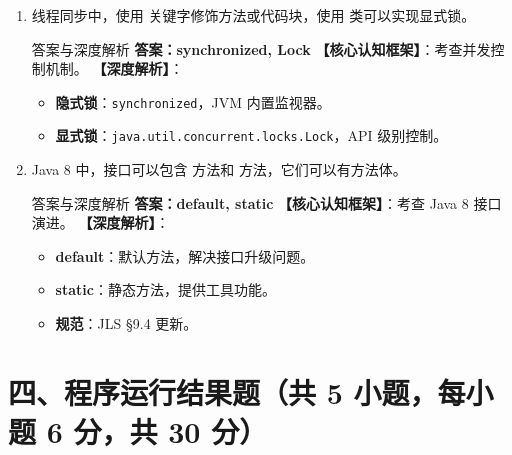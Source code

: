 ﻿\documentclass[12pt, a4paper]{ctexart}
\newcommand{\blank}{\underline{\hspace{2cm}}}
\newcommand{\code}[1]{\texttt{#1}}
\begin{document}
\begin{enumerate}[label=\arabic*., itemsep=1.5em]
	\item 线程同步中，使用 \blank 关键字修饰方法或代码块，使用 \blank 类可以实现显式锁。
	      \begin{bluebox}{答案与深度解析}
		      \textbf{答案：synchronized, Lock}
		      \textbf{【核心认知框架】}：考查并发控制机制。
		      \textbf{【深度解析】}：
		      \begin{itemize}[leftmargin=*, nosep]
			      \item \textbf{隐式锁}：\code{synchronized}，JVM 内置监视器。
			      \item \textbf{显式锁}：\code{java.util.concurrent.locks.Lock}，API 级别控制。
		      \end{itemize}
	      \end{bluebox}

	\item Java 8 中，接口可以包含 \blank 方法和 \blank 方法，它们可以有方法体。
	      \begin{bluebox}{答案与深度解析}
		      \textbf{答案：default, static}
		      \textbf{【核心认知框架】}：考查 Java 8 接口演进。
		      \textbf{【深度解析】}：
		      \begin{itemize}[leftmargin=*, nosep]
			      \item \textbf{default}：默认方法，解决接口升级问题。
			      \item \textbf{static}：静态方法，提供工具功能。
			      \item \textbf{规范}：JLS §9.4 更新。
		      \end{itemize}
	      \end{bluebox}
\end{enumerate}

\newpage
\section{四、程序运行结果题（共 5 小题，每小题 6 分，共 30 分）}
\end{document}
